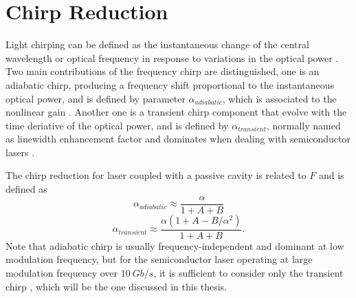 \section{Chirp Reduction}\label{sec:chirp_reduction}
Light chirping can be defined as the instantaneous change of the central wavelength or optical frequency in response to variations in the optical power \cite{villafranca2007precise}. Two main contributions of the frequency chirp are distinguished, one is an adiabatic chirp, producing a frequency shift proportional to the instantaneous optical power, and is defined by parameter $\alpha_{adiabatic}$, which is associated to the nonlinear gain \cite{villafranca2007precise, harder1983measurement}. Another one is a transient chirp component that evolve with the time deriative of the optical power, and is defined by $\alpha_{transient}$, normally named as linewidth enhancement factor \cite{henry1982theory} and dominates when dealing with semiconductor lasers \cite{choi2015evaluation}. 



The chirp reduction for laser coupled with a passive cavity is related to $F$ and is defined as \cite{choi2015evaluation,kazarinov1987relation, petermann2012laser}
\begin{equation}
    \alpha_{adiabatic}\approx\frac{\alpha}{1+A+B}
    \label{eq:chirp_reduction_adiabatic}
\end{equation}
\begin{equation}
    \alpha_{transient}\approx\frac{\alpha(1+A-B/\alpha^2)}{1+A+B}.
    \label{eq:chirp_reduction_transient}
\end{equation}
Note that adiabatic chirp is usually frequency-independent and dominant at low modulation frequency, but for the semiconductor laser operating at large modulation frequency over $10 \ Gb/s$, it is sufficient to consider only the transient chirp \cite{choi2015evaluation}, which will be the one discussed in this thesis. 

